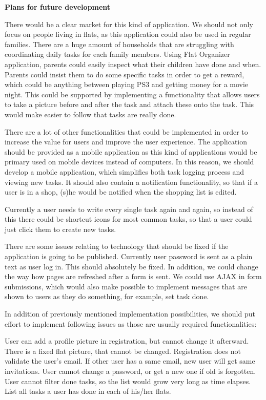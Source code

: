 \documentclass{sig-alt-release2}
\begin{document}
\textbf{Plans for future development}

There would be a clear market for this kind of application. We should not only
focus on people living in flats, as this application could also be used in
regular families. There are a huge amount of households that are struggling with
coordinating daily tasks for each family members. Using Flat Organizer
application, parents could easily inspect what their children have done and
when. Parents could insist them to do some specific tasks in order to get a
reward, which could be anything between playing PS3 and getting money for a
movie night. This could be supported by implementing a functionality that allows
users to take a picture before and after the task and attach these onto the
task. This would make easier to follow that tasks are really done.

There are a lot of other functionalities that could be implemented in order to
increase the value for users and improve the user experience. The application
should be provided as a mobile application as this kind of applications would be
primary used on mobile devices instead of computers. In this reason, we should
develop a mobile application, which simplifies both task logging process and
viewing new tasks. It should also contain a notification functionality, so that
if a user is in a shop, (s)he would be notified when the shopping list is
edited.

Currently a user needs to write every single task again and again, so instead of
this there could be shortcut icons for most common tasks, so that a user could
just click them to create new tasks.

There are some issues relating to technology that should be fixed if the
application is going to be published. Currently user password is sent as a plain
text as user log in. This should absolutely be fixed. In addition, we could
change the way how pages are refreshed after a form is sent. We could use AJAX
in form submissions, which would also make possible to implement messages that
are shown to users as they do something, for example, set task done.

In addition of previously mentioned implementation possibilities, we should put
effort to implement following issues as those are usually required
functionalities:

User can add a profile picture in registration, but cannot change it afterward.
There is a fixed flat picture, that cannot be changed. Registration does not
validate the user's email. If other user has a same email, new user will get
same invitations. User cannot change a password, or get a new one if old is
forgotten. User cannot filter done tasks, so the list would grow very long as
time elapses. List all tasks a user has done in each of his/her flats.
\end{document}
